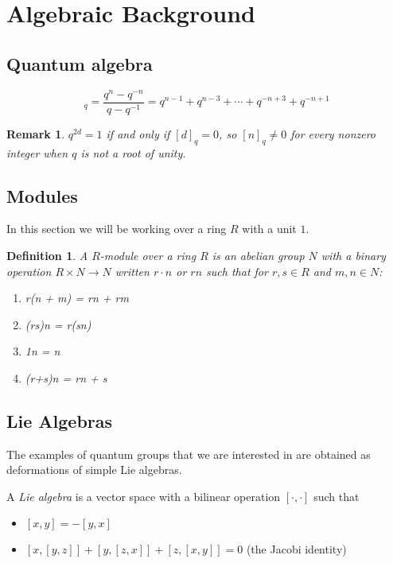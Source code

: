 \documentclass[]{article}
\newtheorem{remark}[theorem]{Remark}
\newtheorem{defn}[theorem]{Definition}
\numberwithin{equation}{subsection}
\begin{document}
\tableofcontents
\section{Algebraic Background}
\subsection{Quantum algebra}

\begin{equation}
    [n]_q = \frac{q^n - q^{-n}}{q - q^{-1}} = q^{n-1} + q^{n-3} + \cdots + q^{-n+3} + q^{-n+1}
\end{equation}

\begin{remark}
$q^{2d}=1$ if and only if $[d]_q = 0$, so $[n]_q \neq 0$ for every nonzero integer when $q$ is not a root of unity. 
\end{remark}


\subsection{Modules}

In  this section we will be working over a ring $R$ with a unit $1$. 
\begin{defn}
    A $R$-\emph{module} over a ring $R$ is an abelian group $N$ with a binary
    operation $R \times N \to N$ written $r\cdot n$ or $rn$ such that for $r,s \in R$ and $m,n \in N$:

    \begin{enumerate}
        \item r(n + m) = rn + rm
        \item (rs)n = r(sn)
        \item 1n = n
        \item (r+s)n = rn + s
    \end{enumerate}
\end{defn}


\subsection{Lie Algebras}

The examples of quantum groups that we are interested in are obtained as deformations of simple Lie algebras. 

A \emph{Lie algebra} is a vector space with a bilinear operation $\left[ \cdot, \cdot \right]$ such that 

\begin{itemize}
    \item $\left[ x,y \right] = -\left[ y,x \right]$
    \item $\left[ x, \left[ y,z \right] \right] + \left[ y, \left[ z,x \right] \right] + \left[ z, \left[ x,y \right] \right] = 0$ (the Jacobi identity)
\end{itemize}
\end{document}
